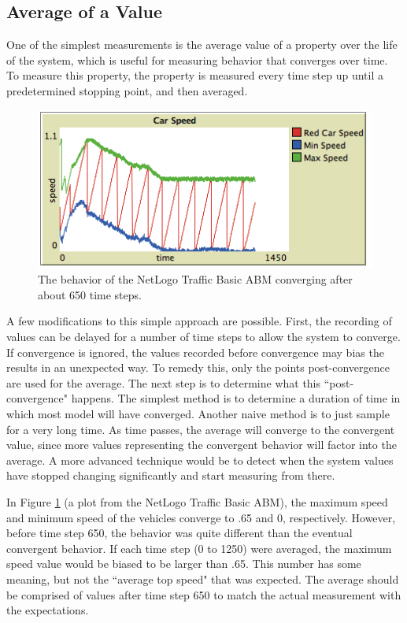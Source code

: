 \subsection{Average of a Value}
One of the simplest measurements is the average value of a property over the life of the system, which is useful for measuring behavior that converges over time.
To measure this property, the property is measured every time step up until a predetermined stopping point, and then averaged.

\begin{figure}[ht]
\centering
\includegraphics[scale=.75]{images/traffic_converge.png}
\caption{The behavior of the NetLogo Traffic Basic ABM converging after about 650 time steps.}
\label{fig:traffic_converge}
\end{figure}


A few modifications to this simple approach are possible.
First, the recording of values can be delayed for a number of time steps to allow the system to converge.
If convergence is ignored, the values recorded before convergence may bias the results in an unexpected way.
To remedy this, only the points post-convergence are used for the average.
The next step is to determine what this ``post-convergence" happens.
The simplest method is to determine a duration of time in which most model will have converged.
Another naive method is to just sample for a very long time.
As time passes, the average will converge to the convergent value, since more values representing the convergent behavior will factor into the average.
A more advanced technique would be to detect when the system values have stopped changing significantly and start measuring from there.

In Figure \ref{fig:traffic_converge} (a plot from the NetLogo Traffic Basic ABM), the maximum speed and minimum speed of the vehicles converge to .65 and 0, respectively.
However, before time step 650, the behavior was quite different than the eventual convergent behavior.
If each time step (0 to 1250) were averaged, the maximum speed value would be biased to be larger than .65.
This number has some meaning, but not the ``average top speed" that was expected.
The average should be comprised of values after time step 650 to match the actual measurement with the expectations.

